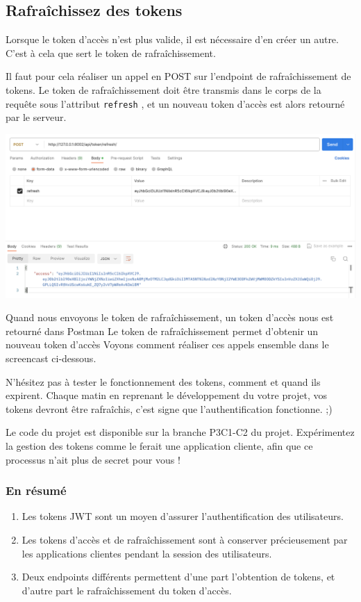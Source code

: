 \documentclass[a4paper]{article}
\begin{document}
\subsection{Rafraîchissez des tokens}
Lorsque le token d’accès n’est plus valide, il est nécessaire d’en créer un autre. C’est à cela que sert le {\color{monOrange}token de rafraîchissement}.

Il faut pour cela réaliser un appel en POST sur l’endpoint de rafraîchissement de tokens. Le token de rafraîchissement doit être transmis dans le corps de la requête sous l’attribut {\tt refresh}  , et un nouveau token d’accès est alors retourné par le serveur.
\begin{center}
\includegraphics[width=15cm]{images/image26.png}
\end{center}
Quand nous envoyons le token de rafraîchissement, un token d’accès nous est retourné dans Postman
Le token de rafraîchissement permet d’obtenir un nouveau token d’accès
Voyons comment réaliser ces appels ensemble dans le screencast ci-dessous.


N’hésitez pas à tester le fonctionnement des tokens, comment et quand ils expirent. Chaque matin en reprenant le développement du votre projet, vos tokens devront être rafraîchis, c’est signe que l’authentification fonctionne. ;)

Le code du projet est disponible sur la branche P3C1-C2 du projet. Expérimentez la gestion des tokens comme le ferait une application cliente, afin que ce processus n’ait plus de secret pour vous !

\subsubsection*{En résumé}
\begin{enumerate}
\item Les tokens JWT sont un moyen d’assurer l’authentification des utilisateurs.
\item Les tokens d’accès et de rafraîchissement sont à conserver précieusement par les applications clientes pendant la session des utilisateurs.
\item Deux endpoints différents permettent d’une part l’obtention de tokens, et d’autre part le rafraîchissement du token d’accès.
\end{enumerate}
\end{document}
